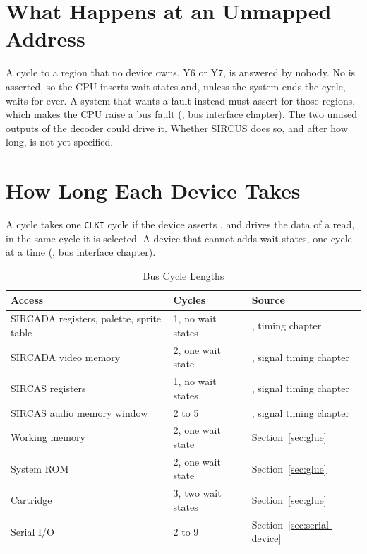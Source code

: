 \section{What Happens at an Unmapped Address}
\label{sec:unmapped}

A cycle to a region that no device owns, Y6 or Y7, is answered by nobody. No  is asserted, so the CPU
inserts wait states and, unless the system ends the cycle, waits for ever. A system that wants a fault instead must
assert  for those regions, which makes the CPU raise a bus fault (\hwmanual{}, bus interface chapter).
The two unused outputs of the decoder could drive it. Whether SIRCUS does so, and after how long, is not yet specified.

\section{How Long Each Device Takes}
\label{sec:answer-times}

A cycle takes one \texttt{CLKI} cycle if the device asserts , and drives the data of a read, in the
same cycle it is selected. A device that cannot adds wait states, one cycle at a time (\hwmanual{}, bus interface
chapter).

\begin{table}[H]
	\centering
	\begin{tabular}{p{5.4cm}p{2.7cm}p{4.2cm}}
		\toprule
		\textbf{Access}                          & \textbf{Cycles}    & \textbf{Source}                       \\
		\midrule
		SIRCADA registers, palette, sprite table & 1, no wait states  & \videomanual{}, timing chapter        \\
		SIRCADA video memory                     & 2, one wait state  & \videomanual{}, signal timing chapter \\
		SIRCAS registers                         & 1, no wait states  & \audiomanual{}, signal timing chapter \\
		SIRCAS audio memory window               & 2 to 5             & \audiomanual{}, signal timing chapter \\
		Working memory                           & 2, one wait state  & Section~\ref{sec:glue}                \\
		System ROM                               & 2, one wait state  & Section~\ref{sec:glue}                \\
		Cartridge                                & 3, two wait states & Section~\ref{sec:glue}                \\
		Serial I/O                               & 2 to 9             & Section~\ref{sec:serial-device}       \\
		\bottomrule
	\end{tabular}
	\caption{Bus Cycle Lengths}
	\label{tab:answer-times}
\end{table}

